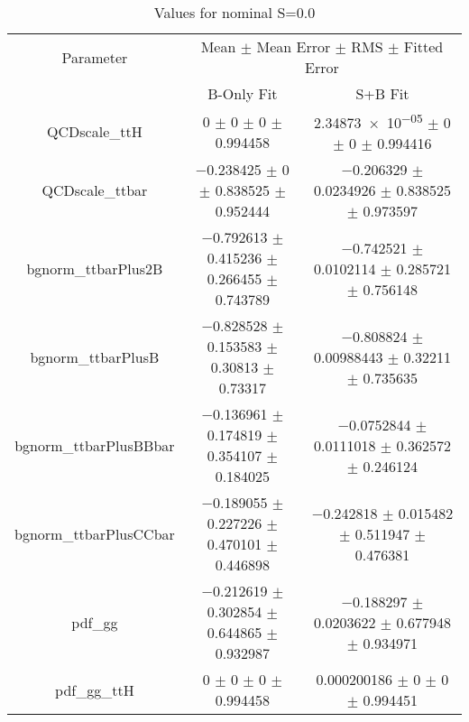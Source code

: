\begin{table}
\centering
\caption{Values for nominal S=0.0}
\begin{tabular}{ccc}
\toprule
Parameter & \multicolumn{2}{c}{Mean $\pm$ Mean Error $\pm$ RMS $\pm$ Fitted Error}\\
 & B-Only Fit & S+B Fit\\
\midrule
QCDscale\_ttH & \num{0} $\pm$ \num{0} $\pm$ \num{0} $\pm$ \num{0.994458} & \num{2.34873e-05} $\pm$ \num{0} $\pm$ \num{0} $\pm$ \num{0.994416}\\
QCDscale\_ttbar & \num{-0.238425} $\pm$ \num{0} $\pm$ \num{0.838525} $\pm$ \num{0.952444} & \num{-0.206329} $\pm$ \num{0.0234926} $\pm$ \num{0.838525} $\pm$ \num{0.973597}\\
bgnorm\_ttbarPlus2B & \num{-0.792613} $\pm$ \num{0.415236} $\pm$ \num{0.266455} $\pm$ \num{0.743789} & \num{-0.742521} $\pm$ \num{0.0102114} $\pm$ \num{0.285721} $\pm$ \num{0.756148}\\
bgnorm\_ttbarPlusB & \num{-0.828528} $\pm$ \num{0.153583} $\pm$ \num{0.30813} $\pm$ \num{0.73317} & \num{-0.808824} $\pm$ \num{0.00988443} $\pm$ \num{0.32211} $\pm$ \num{0.735635}\\
bgnorm\_ttbarPlusBBbar & \num{-0.136961} $\pm$ \num{0.174819} $\pm$ \num{0.354107} $\pm$ \num{0.184025} & \num{-0.0752844} $\pm$ \num{0.0111018} $\pm$ \num{0.362572} $\pm$ \num{0.246124}\\
bgnorm\_ttbarPlusCCbar & \num{-0.189055} $\pm$ \num{0.227226} $\pm$ \num{0.470101} $\pm$ \num{0.446898} & \num{-0.242818} $\pm$ \num{0.015482} $\pm$ \num{0.511947} $\pm$ \num{0.476381}\\
pdf\_gg & \num{-0.212619} $\pm$ \num{0.302854} $\pm$ \num{0.644865} $\pm$ \num{0.932987} & \num{-0.188297} $\pm$ \num{0.0203622} $\pm$ \num{0.677948} $\pm$ \num{0.934971}\\
pdf\_gg\_ttH & \num{0} $\pm$ \num{0} $\pm$ \num{0} $\pm$ \num{0.994458} & \num{0.000200186} $\pm$ \num{0} $\pm$ \num{0} $\pm$ \num{0.994451}\\
\bottomrule
\end{tabular}
\end{table}